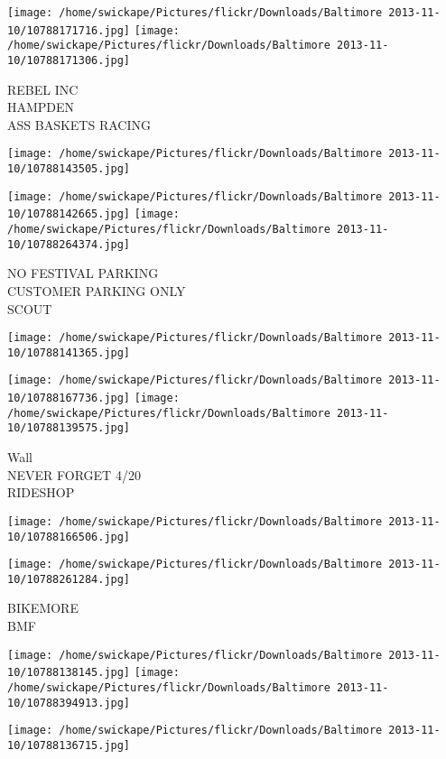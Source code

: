 \documentclass[10pt,letterpaper]{article}
\begin{document}
\vspace{0.25in}
\texttt{[image: /home/swickape/Pictures/flickr/Downloads/Baltimore 2013-11-10/10788171716.jpg]}
\texttt{[image: /home/swickape/Pictures/flickr/Downloads/Baltimore 2013-11-10/10788171306.jpg]}

REBEL INC\\
HAMPDEN\\
ASS BASKETS RACING
\pagebreak

\texttt{[image: /home/swickape/Pictures/flickr/Downloads/Baltimore 2013-11-10/10788143505.jpg]}

\vspace{0.25in}
\texttt{[image: /home/swickape/Pictures/flickr/Downloads/Baltimore 2013-11-10/10788142665.jpg]}
\texttt{[image: /home/swickape/Pictures/flickr/Downloads/Baltimore 2013-11-10/10788264374.jpg]}

NO FESTIVAL PARKING\\
CUSTOMER PARKING ONLY\\
SCOUT
\pagebreak

\texttt{[image: /home/swickape/Pictures/flickr/Downloads/Baltimore 2013-11-10/10788141365.jpg]}

\vspace{0.25in}
\texttt{[image: /home/swickape/Pictures/flickr/Downloads/Baltimore 2013-11-10/10788167736.jpg]}
\texttt{[image: /home/swickape/Pictures/flickr/Downloads/Baltimore 2013-11-10/10788139575.jpg]}

Wall\\
NEVER FORGET 4/20\\
RIDESHOP
\pagebreak

\texttt{[image: /home/swickape/Pictures/flickr/Downloads/Baltimore 2013-11-10/10788166506.jpg]}

\vspace{0.25in}
\texttt{[image: /home/swickape/Pictures/flickr/Downloads/Baltimore 2013-11-10/10788261284.jpg]}

BIKEMORE\\
BMF
\pagebreak

\texttt{[image: /home/swickape/Pictures/flickr/Downloads/Baltimore 2013-11-10/10788138145.jpg]}
\texttt{[image: /home/swickape/Pictures/flickr/Downloads/Baltimore 2013-11-10/10788394913.jpg]}

\vspace{0.25in}
\texttt{[image: /home/swickape/Pictures/flickr/Downloads/Baltimore 2013-11-10/10788136715.jpg]}
\end{document}
